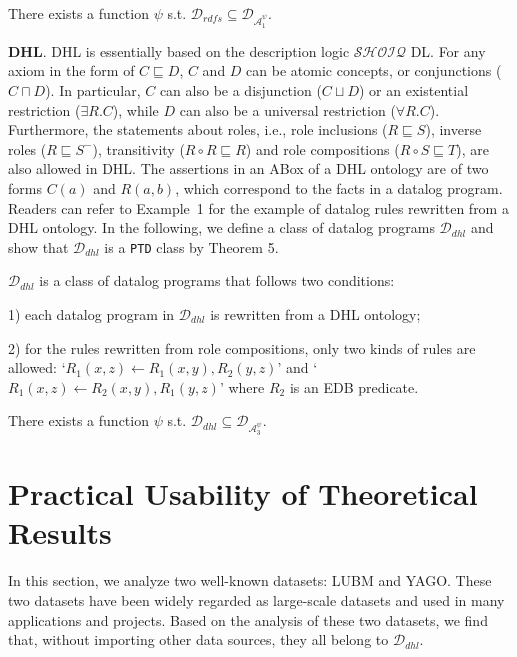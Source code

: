 \documentclass{article}
\begin{document}
\begin{theorem} There exists a function $\psi$ s.t. $\mathcal{D}_{rdfs}\subseteq\mathcal{D}_{\mathcal{A}_1^{\psi}}$.
\end{theorem}

\textbf{DHL}. DHL \cite{DBLP:conf/www/GrosofHVD03} is essentially based on the description logic $\mathcal{SHOIQ}$
DL. For any axiom in the form of $C\sqsubseteq D$, $C$ and $D$ can be atomic concepts, or conjunctions ($C\sqcap D$).
In particular, $C$ can also be a disjunction ($C\sqcup D$) or an existential restriction ($\exists R.C$), while $D$
can also be a universal restriction ($\forall R.C$). Furthermore, the statements about roles, i.e., role inclusions ($R\sqsubseteq S$), inverse roles ($R\sqsubseteq S^-$), transitivity ($R\circ R\sqsubseteq R$) and role compositions ($R\circ S\sqsubseteq T$), are also allowed in DHL.
The assertions in
an ABox of a DHL ontology are of two forms $C(a)$ and $R(a,b)$, which correspond to the facts
in a datalog program. Readers can refer to Example~1 for
the example of datalog rules rewritten from a DHL ontology.
In the following, we define a class of datalog programs $\mathcal{D}_{dhl}$ and
show that $\mathcal{D}_{dhl}$ is a \texttt{PTD} class by Theorem 5.

\begin{definition}\label{def:ddhl} $\mathcal{D}_{dhl}$ is a class of datalog programs that follows two conditions:

1) each datalog program in $\mathcal{D}_{dhl}$ is rewritten from a DHL ontology;

2) for the rules rewritten from role compositions, only two kinds of rules are allowed: `$R_1(x,z)\leftarrow R_1(x,y),R_2(y,z)$' and `$R_1(x,z)\leftarrow R_2(x,y),R_1(y,z)$'
where $R_2$ is an EDB predicate.
\end{definition}

\begin{theorem} There exists a function $\psi$ s.t. $\mathcal{D}_{dhl}\subseteq\mathcal{D}_{\mathcal{A}_3^{\psi}}$.
\end{theorem}

\section{Practical Usability of Theoretical Results}

In this section, we analyze two well-known datasets: LUBM and YAGO. These two datasets have been widely regarded as large-scale datasets and used in many applications and projects. Based on the analysis of these two datasets, we find that, without importing other data sources, they all belong to
$\mathcal{D}_{dhl}$.
\end{document}
